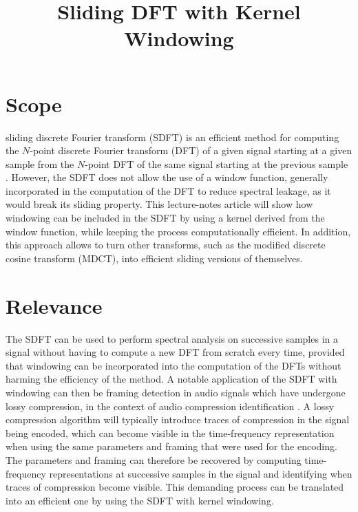 \documentclass[journal]{IEEEtran}
\begin{document}
\title{Sliding DFT with Kernel Windowing}

\maketitle

\section{Scope}

 sliding discrete Fourier transform (SDFT) is an efficient method for computing the $N$-point discrete Fourier transform (DFT) of a given signal starting at a given sample from the $N$-point DFT of the same signal starting at the previous sample \cite{jacobsen2003}. However, the SDFT does not allow the use of a window function, generally incorporated in the computation of the DFT to reduce spectral leakage, as it would break its sliding property. This lecture-notes article will show how windowing can be included in the SDFT by using a kernel derived from the window function, while keeping the process computationally efficient. In addition, this approach allows to turn other transforms, such as the modified discrete cosine transform (MDCT), into efficient sliding versions of themselves. 


\section{Relevance}

The SDFT can be used to perform spectral analysis on successive samples in a signal without having to compute a new DFT from scratch every time, provided that windowing can be incorporated into the computation of the DFTs without harming the efficiency of the method. A notable application of the SDFT with windowing can then be framing detection in audio signals which have undergone lossy compression, in the context of audio compression identification \cite{kim2018}. A lossy compression algorithm will typically introduce traces of compression in the signal being encoded, which can become visible in the time-frequency representation when using the same parameters and framing that were used for the encoding. The parameters and framing can therefore be recovered by computing time-frequency representations at successive samples in the signal and identifying when traces of compression become visible. This demanding process can be translated into an efficient one by using the SDFT with kernel windowing.
\end{document}
